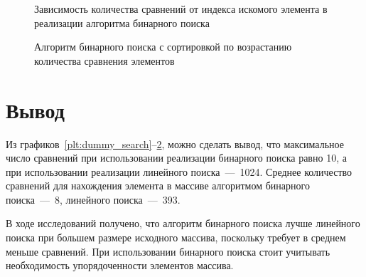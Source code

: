 \begin{figure}[H]
	\centering
	
	\caption{Зависимость количества сравнений от индекса искомого элемента в реализации алгоритма  бинарного поиска}
	\label{plt:bin_search}
\end{figure}

\begin{figure}[H]
	\centering
	
	\caption{Алгоритм бинарного поиска с сортировкой по возрастанию количества сравнения элементов}
	\label{plt:bin_search_sorted}
\end{figure}

\section*{Вывод}
Из графиков~\ref{plt:dummy_search}--\ref{plt:bin_search_sorted}, можно сделать вывод, что максимальное число сравнений при использовании реализации бинарного поиска равно 10, а при использовании реализации линейного поиска~---~1024. Среднее количество сравнений для нахождения элемента в массиве алгоритмом бинарного поиска~---~8, линейного поиска~---~393. 

В ходе исследований получено, что алгоритм бинарного поиска лучше линейного поиска при большем размере исходного массива, поскольку требует в среднем меньше сравнений. При использовании бинарного поиска стоит учитывать необходимость упорядоченности элементов массива.


